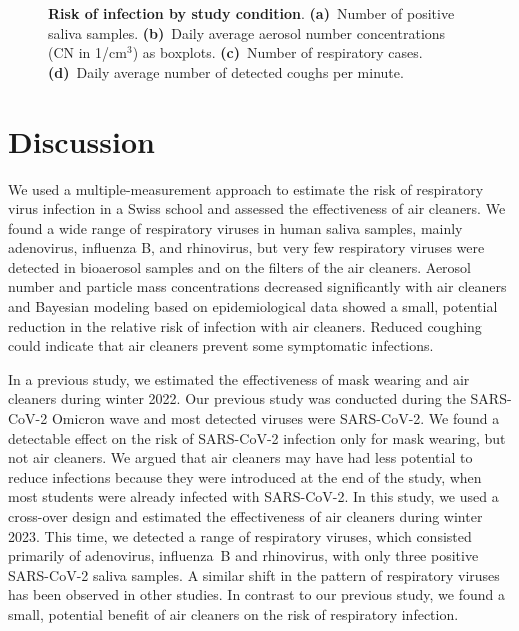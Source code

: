 \documentclass[fleqn,11pt]{wlscirep}
\begin{document}
\begin{figure}[!htpb]
    \caption{\textbf{Risk of infection by study condition}. \textbf{(a)}~Number of positive saliva samples. \textbf{(b)}~Daily average aerosol number concentrations (CN in 1/cm$^3$) as boxplots. \textbf{(c)}~Number of respiratory cases. \textbf{(d)}~Daily average number of detected coughs per minute.}
    \label{fig:palas-results}
\end{figure}

\FloatBarrier

\newpage

\section{Discussion}


We used a multiple-measurement approach to estimate the risk of respiratory virus infection in a Swiss school and assessed the effectiveness of air cleaners. We found a wide range of respiratory viruses in human saliva samples, mainly adenovirus, influenza B, and rhinovirus, but very few respiratory viruses were detected in bioaerosol samples and on the filters of the air cleaners. Aerosol number and particle mass concentrations decreased significantly with air cleaners and Bayesian modeling based on epidemiological data showed a small, potential reduction in the relative risk of infection with air cleaners. Reduced coughing could indicate that air cleaners prevent some symptomatic infections.


In a previous study\cite{Banholzer2023PLoSMed}, we estimated the effectiveness of mask wearing and air cleaners during winter 2022. Our previous study was conducted during the SARS-CoV-2 Omicron wave and most detected viruses were SARS-CoV-2. We found a detectable effect on the risk of SARS-CoV-2 infection only for mask wearing, but not air cleaners. We argued that air cleaners may have had less potential to reduce infections because they were introduced at the end of the study, when most students were already infected with SARS-CoV-2. In this study, we used a cross-over design and estimated the effectiveness of air cleaners during winter 2023. This time, we detected a range of respiratory viruses, which consisted primarily of adenovirus, influenza~B and rhinovirus, with only three positive SARS-CoV-2 saliva samples. A similar shift in the pattern of respiratory viruses has been observed in other studies\cite{Nygaard2023Lancet,Sauteur2022EuroSurv}. In contrast to our previous study, we found a small, potential benefit of air cleaners on the risk of respiratory infection. 
\end{document}
